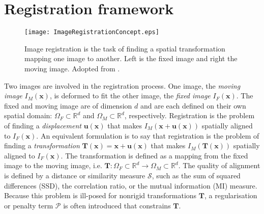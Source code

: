 \documentclass[]{report}
\newcommand{\vx}{\bm{x}}
\newcommand{\vux}{\bm{u}(\bm{x})}
\newcommand{\vT}{\bm{T}}
\newcommand{\Sim}{\mathcal{S}}
\newcommand{\Pen}{\mathcal{P}}
\begin{document}
\section{Registration framework}\label{sec:framework}

\begin{figure}[tb]
\centering
\texttt{[image: ImageRegistrationConcept.eps]}
\caption{Image registration is the task of finding a spatial
transformation mapping one image to another. Left is the fixed image
and right the moving image. Adopted from
\citet{ITKSoftwareGuideSecondEdition}.} \label{fig:concept}
\end{figure}

Two images are involved in the registration process. One image, the
\emph{moving image} $I_M(\vx)$, is deformed to fit the other image,
the \emph{fixed image} $I_F(\vx)$. The fixed and moving image are of
dimension $d$ and are each defined on their own spatial domain:
$\Omega_F \subset \mathbb{R}^d$ and $\Omega_M \subset \mathbb{R}^d$,
respectively. Registration is the problem of finding a
\emph{displacement} $\vux$ that makes $I_M(\vx + \vux)$ spatially
aligned to $I_F(\vx)$. An equivalent formulation is to say that
registration is the problem of finding a \emph{transformation}
$\vT(\vx) = \vx + \vux $ that makes $I_M(\vT(\vx))$ spatially
aligned to $I_F(\vx)$. The transformation is defined as a mapping
from the fixed image to the moving image, i.e. $\vT: \Omega_F
\subset \mathbb{R}^d \rightarrow \Omega_M \subset \mathbb{R}^d$. The
quality of alignment is defined by a distance or similarity measure
$\Sim$, such as the sum of squared differences (SSD), the
correlation ratio, or the mutual information (MI) measure. Because
this problem is ill-posed for nonrigid transformations $\vT$, a
regularisation or penalty term $\Pen$ is often introduced that
constrains $\vT$.
\end{document}
